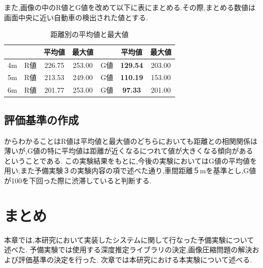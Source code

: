 
また,画像の中のR値とG値を改めて以下に表にまとめる.その際,まとめる数値は画面中央に近い自動車の検出された値とする.

\begin{table}[htbp]
  \centering
  \begin{scriptsize}
  \begin{tabular}{ccccccc}
  \toprule
& & 平均値 & 最大値 & & 平均値 & 最大値 \\
  \midrule
4m & R値 & 226.75 & 253.00 & G値 & {\bf129.54} & 203.00 \\
5m & R値 & 213.53 & 249.00 & G値 & {\bf 110.19} & 153.00 \\
6m & R値 & 201.77 & 253.00 & G値 & {\bf 97.33} & 201.00\\
  \bottomrule
  \end{tabular}
  \end{scriptsize}
  \caption{距離別の平均値と最大値}
  \label{tab:mean_max}
\end{table}

\subsection{評価基準の作成}
からわかることはR値は平均値と最大値のどちらにおいても距離との相関関係は薄いが,G値の特に平均値は距離が近くなるにつれて値が大きくなる傾向があるということである.
この実験結果をもとに,今後の実験においてはG値の平均値を用い,また予備実験３の実験内容の項で述べた通り,車間距離５mを基準とし,G値が100を下回った際に渋滞していると判断する.

\section{まとめ}
本章では,本研究において実装したシステムに関して行なった予備実験について述べた.
予備実験では使用する深度推定ライブラリの決定,画像圧縮問題の解決および評価基準の決定を行った.
次章では本研究における本実験について述べる.